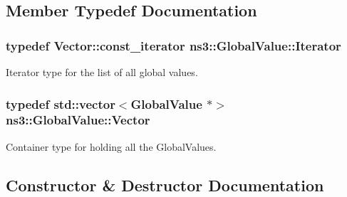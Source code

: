 \subsection{Member Typedef Documentation}
\subsubsection[{\texorpdfstring{Iterator}{Iterator}}]{\setlength{\rightskip}{0pt plus 5cm}typedef Vector\+::const\+\_\+iterator {\bf ns3\+::\+Global\+Value\+::\+Iterator}}\hypertarget{classns3_1_1GlobalValue_a1bb2cbb186e3759817095c9a5f5f544e}{}\label{classns3_1_1GlobalValue_a1bb2cbb186e3759817095c9a5f5f544e}
Iterator type for the list of all global values. 
\subsubsection[{\texorpdfstring{Vector}{Vector}}]{\setlength{\rightskip}{0pt plus 5cm}typedef std\+::vector$<${\bf Global\+Value} $\ast$$>$ {\bf ns3\+::\+Global\+Value\+::\+Vector}\hspace{0.3cm}{\ttfamily [private]}}\hypertarget{classns3_1_1GlobalValue_a674b6c1d387dc3b62e416c7fff43a4e9}{}\label{classns3_1_1GlobalValue_a674b6c1d387dc3b62e416c7fff43a4e9}
Container type for holding all the Global\+Values. 

\subsection{Constructor \& Destructor Documentation}
